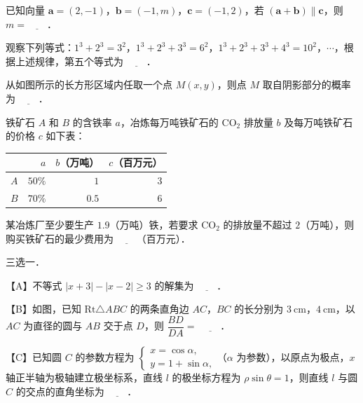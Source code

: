 \begin{question}
已知向量 $\boldsymbol a=(2,-1)$，$\boldsymbol b=(-1,m)$，$\boldsymbol c=(-1,2)$，若 $(\boldsymbol a+\boldsymbol b)\parallel\boldsymbol c$，则 $m=\underline{\qquad}$．

\end{question}
\begin{question}
观察下列等式：$1^3+2^3=3^2$，$1^3+2^3+3^3=6^2$，$1^3+2^3+3^3+4^3=10^2$，$\cdots$，根据上述规律，第五个等式为 $\underline{\qquad}$．

\Needspace{0.4\textheight}
\end{question}
\begingroup
\renewenvironment{question}{\Needspace{0.5\textheight}}{}
\begin{question}
从如图所示的长方形区域内任取一个点 $M(x,y)$，则点 $M$ 取自阴影部分的概率为 $\underline{\qquad}$．
\nopagebreak[4]
\begin{center}\end{center}
\nopagebreak[4]
\end{question}
\endgroup
\begin{question}
铁矿石 $A$ 和 $B$ 的含铁率 $a$，冶炼每万吨铁矿石的 $\mathrm{CO_2}$ 排放量 $b$ 及每万吨铁矿石的价格 $c$ 如下表：

\begin{center}
\begin{tabular}{lrrr}
\toprule
 & $a$ & $b$（万吨） & $c$（百万元） \\
\midrule
$A$ & $50\%$ & $1$ & $3$ \\
$B$ & $70\%$ & $0.5$ & $6$ \\
\bottomrule
\end{tabular}
\end{center}

某冶炼厂至少要生产 $1.9$（万吨）铁，若要求 $\mathrm{CO_2}$ 的排放量不超过 $2$（万吨），则购买铁矿石的最少费用为 $\underline{\qquad}$（百万元）．

\Needspace{0.4\textheight}
\end{question}
\begingroup
\renewenvironment{question}{\Needspace{0.35\textheight}}{}
\begin{question}
三选一．

【A】不等式 $|x+3|-|x-2|\geqslant 3$ 的解集为 $\underline{\qquad}$．

【B】如图，已知 $\mathrm{Rt}\triangle ABC$ 的两条直角边 $AC$，$BC$ 的长分别为 $3\ \mathrm{cm}$，$4\ \mathrm{cm}$，以 $AC$ 为直径的圆与 $AB$ 交于点 $D$，则 $\dfrac{BD}{DA}=$ $\underline{\qquad}$．
\nopagebreak[4]
\begin{center}\end{center}
\nopagebreak[4]
【C】已知圆 $C$ 的参数方程为 $\begin{cases}x=\cos\alpha,\\[2pt]y=1+\sin\alpha,\end{cases}$（$\alpha$ 为参数），以原点为极点，$x$ 轴正半轴为极轴建立极坐标系，直线 $l$ 的极坐标方程为 $\rho\sin\theta=1$，则直线 $l$ 与圆 $C$ 的交点的直角坐标为 $\underline{\qquad}$．

\end{question}
